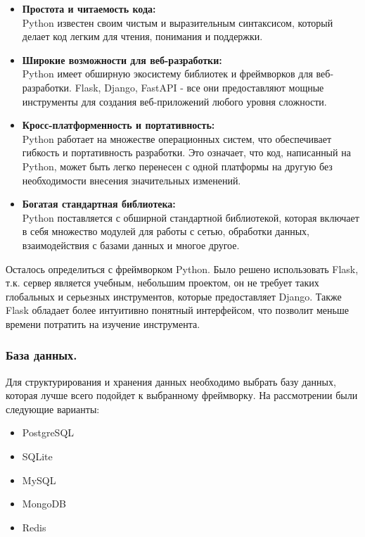 \documentclass[12pt, russian]{extarticle}
\begin{document}
\begin{spacing}{1.5}
    \begin{itemize}
        \item \textbf{Простота и читаемость кода:} \\
            Python известен своим чистым и выразительным синтаксисом,
            который делает код легким для чтения, понимания и поддержки.
        \item \textbf{Широкие возможности для веб-разработки:} \\
            Python имеет обширную экосистему библиотек и фреймворков для веб-разработки.
            Flask, Django, FastAPI - все они предоставляют мощные инструменты для создания веб-приложений
            любого уровня сложности.
        \item \textbf{Кросс-платформенность и портативность:} \\
            Python работает на множестве операционных систем, что обеспечивает гибкость и
            портативность разработки. Это означает, что код, написанный на Python,
            может быть легко перенесен с одной платформы на другую без необходимости
            внесения значительных изменений.
        \item \textbf{Богатая стандартная библиотека:} \\
            Python поставляется с обширной стандартной библиотекой, которая включает
            в себя множество модулей для работы с сетью, обработки данных, взаимодействия
            с базами данных и многое другое.
    \end{itemize}

    Осталось определиться с фреймворком Python. Было решено использовать Flask, т.к.
    сервер является учебным, небольшим проектом, он не требует таких глобальных и серьезных
    инструментов, которые предоставляет Django. Также Flask обладает более интуитивно понятный интерфейсом,
    что позволит меньше времени потратить на изучение инструмента.

    \subsubsection{База данных.}

    Для структурирования и хранения данных необходимо выбрать базу данных, которая лучше всего
    подойдет к выбранному фреймворку. На рассмотрении были следующие варианты:

    \begin{itemize}
        \item PostgreSQL
        \item SQLite
        \item MySQL
        \item MongoDB
        \item Redis
    \end{itemize}


\end{spacing}
\end{document}
